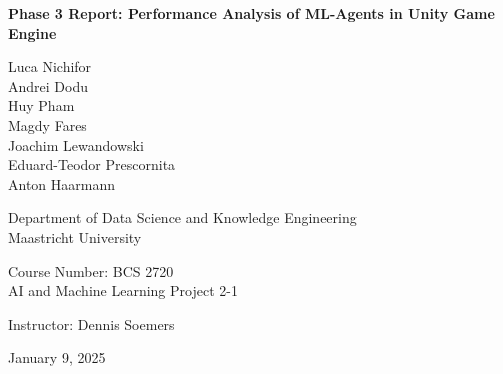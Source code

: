 \begin{titlepage}
\begin{center}
\vspace*{1in} %

{\bfseries\Large\doublespacing Phase 3 Report: Performance Analysis of ML-Agents in Unity Game Engine}

\vspace{2\baselineskip} %

\doublespacing
Luca Nichifor \\
Andrei Dodu \\
Huy Pham \\
Magdy Fares \\
Joachim Lewandowski \\
Eduard-Teodor Prescornita \\
Anton Haarmann

\vspace{2\baselineskip} %

Department of Data Science and Knowledge Engineering \\
Maastricht University

\vspace{2\baselineskip} %

Course Number: BCS 2720 \\
AI and Machine Learning Project 2-1

\vspace{2\baselineskip} %

Instructor: Dennis Soemers

\vspace{2\baselineskip} %

January 9, 2025

\vfill %

\thepage

\end{center}
\end{titlepage}